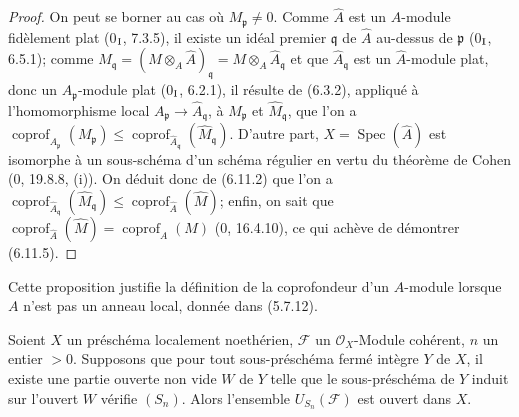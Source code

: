 \begin{proof}
On peut se borner au cas où $M_{\mathfrak p}\ne0$. Comme $\widehat A$ est
un $A$-module fidèlement plat (0$_{\rm I}$, 7.3.5), il existe un idéal
premier $\mathfrak q$ de $\widehat A$ au-dessus de $\mathfrak p$
(0$_{\rm I}$, 6.5.1); comme
$\widehat M_{\mathfrak q}=(M\otimes_A\widehat A)_{\mathfrak q}
=M\otimes_A\widehat A_{\mathfrak q}$ et que
$\widehat A_{\mathfrak q}$ est un $\widehat A$-module plat, donc un
$A_{\mathfrak p}$-module plat (0$_{\rm I}$, 6.2.1), il résulte de (6.3.2),
appliqué à l'homomorphisme local
$A_{\mathfrak p}\to\widehat A_{\mathfrak q}$, à $M_{\mathfrak p}$ et
$\widehat M_{\mathfrak q}$, que l'on a
$\operatorname{coprof}_{A_{\mathfrak p}}(M_{\mathfrak p})\leq
\operatorname{coprof}_{\widehat A_{\mathfrak q}}
(\widehat M_{\mathfrak q})$. D'autre part,
$X=\operatorname{Spec}(\widehat A)$ est isomorphe à un sous-schéma d'un
schéma régulier en vertu du théorème de Cohen (0, 19.8.8, (i)). On déduit
donc de (6.11.2) que l'on a
$\operatorname{coprof}_{\widehat A_{\mathfrak q}}
(\widehat M_{\mathfrak q})\leq
\operatorname{coprof}_{\widehat A}(\widehat M)$; enfin, on sait que
$\operatorname{coprof}_{\widehat A}(\widehat M)=
\operatorname{coprof}_A(M)$ (0, 16.4.10), ce qui achève de démontrer
(6.11.5).
\end{proof}

Cette proposition justifie la définition de la coprofondeur d'un
$A$-module lorsque $A$ n'est pas un anneau local, donnée dans (5.7.12).

\begin{proposition}[6.11.6]
\label{IV.2.s6.11.6-fr}
Soient $X$ un préschéma localement noethérien, $\mathcal F$ un
$\mathcal O_X$-Module cohérent, $n$ un entier $>0$. Supposons que pour tout
sous-préschéma fermé intègre $Y$ de $X$, il existe une partie ouverte non
vide $W$ de $Y$ telle que le sous-préschéma de $Y$ induit sur l'ouvert $W$
vérifie $(S_n)$. Alors l'ensemble $U_{S_n}(\mathcal F)$ est ouvert dans
$X$.
\end{proposition}


